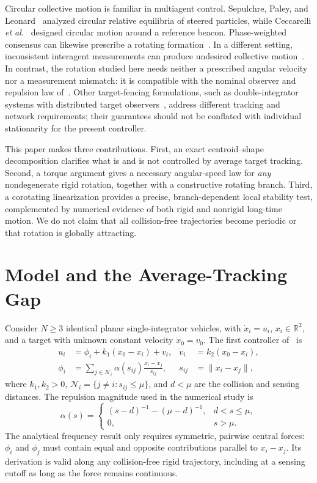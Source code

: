 \documentclass[conference]{IEEEtran}
\newcommand{\R}{\mathbb{R}}
\newcommand{\cN}{\mathcal{N}}
\newcommand{\norm}[1]{\lVert#1\rVert}
\begin{document}
Circular collective motion is familiar in multiagent control. Sepulchre, Paley, and Leonard~\cite{sepulchre2007} analyzed circular relative equilibria of steered particles, while Ceccarelli \emph{et al.}~\cite{ceccarelli2008} designed circular motion around a reference beacon. Phase-weighted consensus can likewise prescribe a rotating formation~\cite{lin2010}. In a different setting, inconsistent interagent measurements can produce undesired collective motion~\cite{garcia2015}. In contrast, the rotation studied here needs neither a prescribed angular velocity nor a measurement mismatch: it is compatible with the nominal observer and repulsion law of~\cite{kou2022}. Other target-fencing formulations, such as double-integrator systems with distributed target observers~\cite{pan2024}, address different tracking and network requirements; their guarantees should not be conflated with individual stationarity for the present controller.

This paper makes three contributions. First, an exact centroid--shape decomposition clarifies what is and is not controlled by average target tracking. Second, a torque argument gives a necessary angular-speed law for \emph{any} nondegenerate rigid rotation, together with a constructive rotating branch. Third, a corotating linearization provides a precise, branch-dependent local stability test, complemented by numerical evidence of both rigid and nonrigid long-time motion. We do not claim that all collision-free trajectories become periodic or that rotation is globally attracting.

\section{Model and the Average-Tracking Gap}
\label{sec:model}
Consider $N\geq3$ identical planar single-integrator vehicles, with $\dot x_i=u_i$, $x_i\in\R^2$, and a target with unknown constant velocity $\dot x_0=v_0$. The first controller of~\cite{kou2022} is
\begin{align}
 u_i&=\phi_i+k_1(x_0-x_i)+v_i, &
 \dot v_i&=k_2(x_0-x_i),\label{eq:control}\\[-1.5ex]
 \phi_i&=\sum_{j\in\cN_i}\alpha(s_{ij})\frac{x_i-x_j}{s_{ij}}, &
 s_{ij}&=\norm{x_i-x_j},\label{eq:force}
\end{align}
where $k_1,k_2>0$, $\cN_i=\{j\ne i:s_{ij}\leq\mu\}$, and $d<\mu$ are the collision and sensing distances. The repulsion magnitude used in the numerical study is
\begin{equation}
 \alpha(s)=\begin{cases}
 (s-d)^{-1}-(\mu-d)^{-1},&d<s\leq\mu,\\
 0,&s>\mu.
 \end{cases}\label{eq:alpha}
\end{equation}
The analytical frequency result only requires symmetric, pairwise central forces: $\phi_i$ and $\phi_j$ must contain equal and opposite contributions parallel to $x_i-x_j$. Its derivation is valid along any collision-free rigid trajectory, including at a sensing cutoff as long as the force remains continuous.
\end{document}
